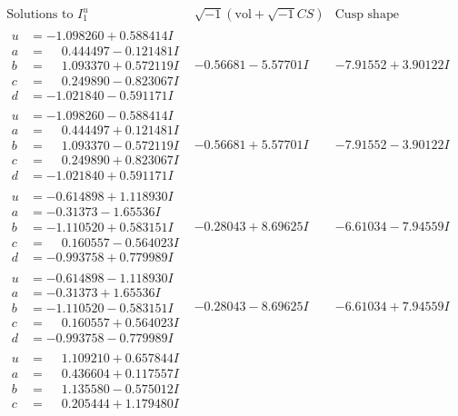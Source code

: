 \documentclass[1p]{elsarticle_modified}
\theoremstyle{definition}
\newcommand{\I}{\sqrt{-1}}
\begin{document}
$$\begin{array}{c|c|c}
\text{Solutions to }I^u_{1}& \I (\text{vol} + \sqrt{-1}CS) & \text{Cusp shape}\\
 \hline 
\begin{aligned}
u &= -1.098260 + 0.588414 I \\
a &= \phantom{-}0.444497 - 0.121481 I \\
b &= \phantom{-}1.093370 + 0.572119 I \\
c &= \phantom{-}0.249890 - 0.823067 I \\
d &= -1.021840 - 0.591171 I\end{aligned}
 & -0.56681 - 5.57701 I & -7.91552 + 3.90122 I \\ \hline\begin{aligned}
u &= -1.098260 - 0.588414 I \\
a &= \phantom{-}0.444497 + 0.121481 I \\
b &= \phantom{-}1.093370 - 0.572119 I \\
c &= \phantom{-}0.249890 + 0.823067 I \\
d &= -1.021840 + 0.591171 I\end{aligned}
 & -0.56681 + 5.57701 I & -7.91552 - 3.90122 I \\ \hline\begin{aligned}
u &= -0.614898 + 1.118930 I \\
a &= -0.31373 - 1.65536 I \\
b &= -1.110520 + 0.583151 I \\
c &= \phantom{-}0.160557 - 0.564023 I \\
d &= -0.993758 + 0.779989 I\end{aligned}
 & -0.28043 + 8.69625 I & -6.61034 - 7.94559 I \\ \hline\begin{aligned}
u &= -0.614898 - 1.118930 I \\
a &= -0.31373 + 1.65536 I \\
b &= -1.110520 - 0.583151 I \\
c &= \phantom{-}0.160557 + 0.564023 I \\
d &= -0.993758 - 0.779989 I\end{aligned}
 & -0.28043 - 8.69625 I & -6.61034 + 7.94559 I \\ \hline\begin{aligned}
u &= \phantom{-}1.109210 + 0.657844 I \\
a &= \phantom{-}0.436604 + 0.117557 I \\
b &= \phantom{-}1.135580 - 0.575012 I \\
c &= \phantom{-}0.205444 + 1.179480 I \\

\end{aligned}
\end{array}$$
\end{document}
